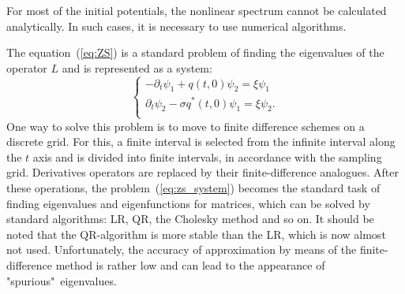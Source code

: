For most of the initial potentials, the nonlinear spectrum cannot be calculated analytically.
In such cases, it is necessary to use numerical algorithms.

The equation~(\ref{eq:ZS}) is a standard problem of finding the eigenvalues of the operator $L$ and is represented as a system:
\begin{equation}
\left\{
\begin{aligned}
	- \partial_{t} \psi_1 + q(t,0) \psi_2 = \xi \psi_1 \\
    \partial_{t} \psi_2 - \sigma q^{*}(t,0) \psi_1 = \xi \psi_2 {.}\\
\end{aligned}
\right.
\label{eq:zs_system} 
\end{equation}
One way to solve this problem is to move to finite difference schemes on a discrete grid. For this, a finite interval is selected from the infinite interval along the $t$ axis and is divided into finite intervals, in accordance with the sampling grid. Derivatives operators are replaced by their finite-difference analogues. After these operations, the problem~(\ref{eq:zs_system}) becomes the standard task of finding eigenvalues and eigenfunctions for matrices, which can be solved by standard algorithms: LR, QR, the Cholesky method and so on. It should be noted that the QR-algorithm is more stable than the LR, which is now almost not used. Unfortunately, the accuracy of approximation by means of the finite-difference method is rather low and can lead to the appearance of "spurious"\ eigenvalues.

